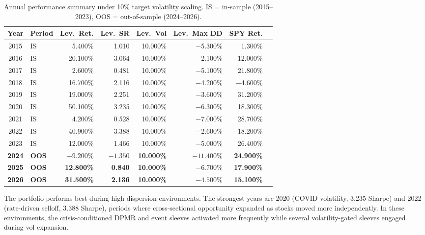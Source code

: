 \documentclass{article}
\begin{document}
\begin{table}[htbp]
    \centering
    \small
    \begin{tabular}{clrrrrrr}
        \toprule
        Year & Period & Lev.\ Ret. & Lev.\ SR & Lev.\ Vol & Lev.\ Max DD & SPY Ret. \\
        \midrule
        2015 & IS & 5.400\% & 1.010 & 10.000\% & $-$5.300\% & 1.300\% \\
        2016 & IS & 20.100\% & 3.064 & 10.000\% & $-$2.100\% & 12.000\% \\
        2017 & IS & 2.600\% & 0.481 & 10.000\% & $-$5.100\% & 21.800\% \\
        2018 & IS & 16.700\% & 2.116 & 10.000\% & $-$4.200\% & $-$4.600\% \\
        2019 & IS & 19.000\% & 2.251 & 10.000\% & $-$3.600\% & 31.200\% \\
        2020 & IS & 50.100\% & 3.235 & 10.000\% & $-$6.300\% & 18.300\% \\
        2021 & IS & 4.200\% & 0.528 & 10.000\% & $-$7.000\% & 28.700\% \\
        2022 & IS & 40.900\% & 3.388 & 10.000\% & $-$2.600\% & $-$18.200\% \\
        2023 & IS & 12.000\% & 1.466 & 10.000\% & $-$5.000\% & 26.400\% \\
        \midrule
        \textbf{2024} & \textbf{OOS} & $\mathbf{-9.200\%}$ & $\mathbf{-1.350}$ & \textbf{10.000\%} & $\mathbf{-11.400\%}$ & \textbf{24.900\%} \\
        \textbf{2025} & \textbf{OOS} & \textbf{12.800\%} & \textbf{0.840} & \textbf{10.000\%} & $\mathbf{-6.700\%}$ & \textbf{17.900\%} \\
        \textbf{2026} & \textbf{OOS} & \textbf{31.500\%} & \textbf{2.136} & \textbf{10.000\%} & $\mathbf{-4.500\%}$ & \textbf{15.100\%} \\
        \bottomrule
    \end{tabular}
    \caption{Annual performance summary under 10\% target volatility scaling. IS = in-sample (2015--2023), OOS = out-of-sample (2024--2026).}
    \label{tab:annual-performance}
\end{table}

The portfolio performs best during high-dispersion environments. The strongest years are 2020 (COVID volatility, 3.235 Sharpe) and 2022 (rate-driven selloff, 3.388 Sharpe), periods where cross-sectional opportunity expanded as stocks moved more independently. In these environments, the crisis-conditioned DPMR and event sleeves activated more frequently while several volatility-gated sleeves engaged during vol expansion.
\end{document}

